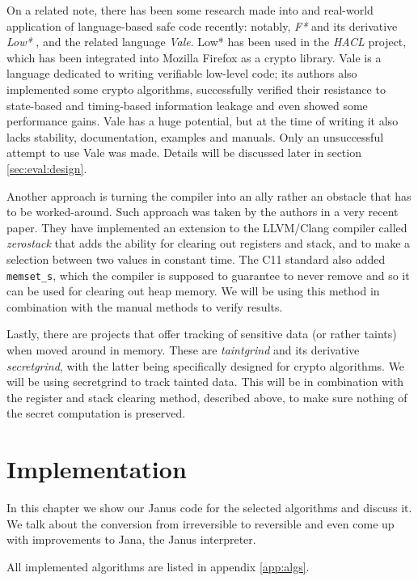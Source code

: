 \documentclass[a4paper,10pt,openright]{memoir}
\newcommand{\term}[1]{\textit{#1}}
\newcommand{\code}[1]{\texttt{#1}}
\begin{document}
On a related note, there has been some research made into and 
real-world application of language-based safe code recently: notably, 
\term{F*} and its derivative \term{Low*} \cite{Low*}, and the related 
language \term{Vale}\cite{vale2017}. Low* has been used in the 
\term{HACL} project, which has been integrated into Mozilla Firefox as 
a crypto library. Vale is a language dedicated to writing verifiable 
low-level code; its authors also implemented some crypto algorithms, 
successfully verified their resistance to state-based and timing-based 
information leakage and even showed some performance gains. Vale has a 
huge potential, but at the time of writing it also lacks stability, 
documentation, examples and manuals. Only an unsuccessful attempt to 
use Vale was made. Details will be discussed later in section 
\ref{sec:eval:design}.

Another approach is turning the compiler into an ally rather an 
obstacle that has to be worked-around. Such approach was taken by the 
authors in a very recent paper\cite{whatyouc}. They have implemented an 
extension to the LLVM/Clang compiler called \term{zerostack} that adds 
the ability for clearing out registers and stack, and to make a 
selection between two values in constant time. The C11 standard also 
added \code{memset\_s}, which the compiler is supposed to guarantee to 
never remove and so it can be used for clearing out heap memory. We 
will be using this method in combination with the manual methods to 
verify results.

Lastly, there are projects that offer tracking of sensitive data (or 
rather taints) when moved 
around in memory. These are \term{taintgrind} and its derivative 
\term{secretgrind}, with the latter being specifically designed for 
crypto algorithms. We will be using secretgrind to track tainted data. 
This will be in combination with the register and stack clearing 
method, described above, to make sure nothing of the secret computation 
is preserved.



\chapter{Implementation}

In this chapter we show our Janus code for the selected algorithms and 
discuss it. We talk about the conversion from irreversible to 
reversible and even come up with improvements to Jana, the Janus 
interpreter.

All implemented algorithms are listed in appendix \ref{app:algs}.
\end{document}
